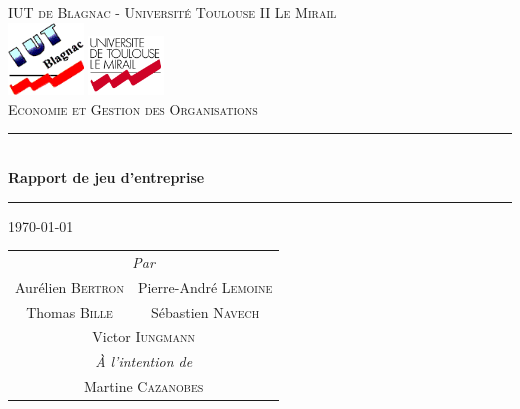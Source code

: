 \documentclass{report}
\begin{document}
\begin{titlepage}

\begin{center}

\textsc{\large IUT de Blagnac - Université Toulouse II Le Mirail}\\[1cm]

\includegraphics[width=2cm]{iutBlagnac}
\hspace{7cm}
\includegraphics[width=2cm]{univMirail}\\[4cm]

\textsc{\Large Economie et Gestion des Organisations}\\

\rule{\linewidth}{.5pt}\\[0.4cm]
{ \huge \bfseries Rapport de jeu d'entreprise}\\[0.4cm]
\rule{\linewidth}{.5pt}


\vfill

\large \today\\[1.5cm]

\begin{tabular}{cc}
	\multicolumn{2}{c}{\emph{Par}}\\
	Aurélien \textsc{Bertron}&Pierre-André \textsc{Lemoine}\\
	Thomas \textsc{Bille}&Sébastien \textsc{Navech}\\
	\multicolumn{2}{c}{Victor \textsc{Iungmann}}\\[0.5cm]
	\multicolumn{2}{c}{\emph{À l'intention de}}\\
	\multicolumn{2}{c}{Martine \textsc{Cazanobes}}\\
\end{tabular}

\end{center}

\end{titlepage}

\tableofcontents




















\end{document}
